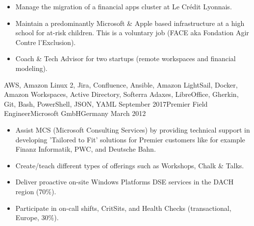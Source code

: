 \begin{experiences}
{\begin{itemize}
                        \item Manage the migration of a financial apps cluster at Le Crédit Lyonnais.                       

                        \item Maintain a predominantly Microsoft \& Apple based infrastructure at a high school for at-risk children. This is a voluntary job (FACE aka Fondation Agir Contre l'Exclusion).

                        \item Coach \& Tech Advisor for two startups (remote workspaces and financial modeling).           
                      \end{itemize}
                    }
                    {AWS, Amazon Linux 2, Jira, Confluence, Ansible, Amazon LightSail, Docker, Amazon Workspaces, Active Directory, Softerra Adaxes, LibreOffice, Gherkin, Git, Bash, PowerShell, JSON, YAML}
  \emptySeparator
  \experience 
    {September 2017}{Premier Field Engineer}{Microsoft GmbH}{Germany}
    {March 2012}    {
                      \begin{itemize}
                        \item Assist MCS (Microsoft Consulting Services) by providing technical support in developing 'Tailored to Fit' solutions for Premier customers like for example Finanz Informatik, PWC, and Deutsche Bahn.

                        \item Create/teach different types of offerings such as Workshops, Chalk \& Talks.  
                        
                        \item Deliver proactive on-site Windows Platforms DSE services in the DACH region (70\%).                   
 
                        \item Participate in on-call shifts, CritSits, and Health Checks (transactional, Europe, 30\%).    


\end{itemize}}
\end{experiences}
